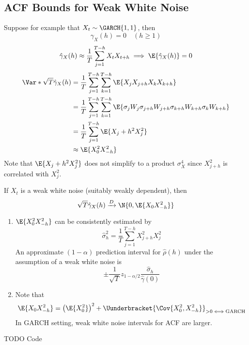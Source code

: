 \subsection*{ACF Bounds for Weak White Noise}
Suppose for example that $ X_t \sim \GARCH{1,1} $, then
\[ \gamma_X(h)=0\quad(h\ge 1) \]
\[ \hat{\gamma}_X(h)\approx \frac{1}{T} \sum_{j=1}^{T-h} X_t X_{t+h}\implies \E{\hat{\gamma}_X(h)}=0 \]
\begin{align*}
    \Var*{\sqrt{T}\hat{\gamma}_X(h)}
     & =\frac{1}{T} \sum_{j=1}^{T-h} \sum_{k=1}^{T-h} \E{X_{j}X_{j+h}X_{k}X_{k+h}}                                            \\
     & =\frac{1}{T} \sum_{j=1}^{T-h} \sum_{k=1}^{T-h} \E{\sigma_j W_j \sigma_{j+h}W_{j+h}\sigma_{k+h}W_{k+h}\sigma_k W_{k+h}} \\
     & =\frac{1}{T} \sum_{j=1}^{T-h} \E{X_j+h^2 X_j^2}                                                                        \\
     & \approx \E{X_0^2 X_{-h}^2}
\end{align*}
Note that $ \E{X_j+h^2 X_j^2} $ does not simplify to a product $ \sigma_X^4 $ since
$ X_{j+h}^2 $ is correlated with $ X_j^2 $.
\begin{Theorem}{}{}
    If $ X_t $ is a weak white noise (suitably weakly dependent), then
    \[ \sqrt{T}\hat{\gamma}_X(h)\xrightarrow{D}\N{0,\E{X_0 X_{-h}^2}} \]
\end{Theorem}
\begin{Remark}{}{}
    \begin{enumerate}[(1)]
        \item $ \E{X_0^2 X_{-h}^2} $ can be consistently estimated by
              \[ \hat{\sigma}_h^2=\frac{1}{T} \sum_{j=1}^{T-h} X_{j+h}^2 X_j^2 \]
              An approximate $ (1-\alpha) $ prediction interval for $ \hat{\rho}(h) $
              under the assumption of a weak white noise is
              \[ \pm \frac{1}{\sqrt{T}}z_{1-\alpha/2}\frac{\hat{\sigma}_h}{\hat{\gamma}(0)}   \]
        \item Note that
              \[ \E{X_0 X_{-h}^2}=\bigl(\E{X_0^2}\bigr)^2+\Uunderbracket{\Cov{X_0^2,X_{-h}^2}}_{>0\iff\text{GARCH}} \]
              In GARCH setting, weak white noise intervals for ACF are larger.
    \end{enumerate}
\end{Remark}
TODO Code
